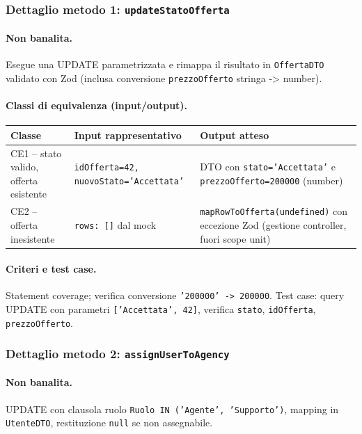 \documentclass[a4paper,11pt]{article}
\begin{document}
\subsubsection{Dettaglio metodo 1: \texttt{updateStatoOfferta}}
\paragraph{Non banalita.}
Esegue una UPDATE parametrizzata e rimappa il risultato in \texttt{OffertaDTO} validato con Zod (inclusa conversione \texttt{prezzoOfferto} stringa -> number).

\paragraph{Classi di equivalenza (input/output).}
\begin{table}[H]
\centering
\small
\begin{tabular}{@{}p{}p{}p{}@{}}
\toprule
Classe & Input rappresentativo & Output atteso \\
\midrule
CE1 -- stato valido, offerta esistente & \texttt{idOfferta=42, nuovoStato='Accettata'} & DTO con \texttt{stato='Accettata'} e \texttt{prezzoOfferto=200000} (number) \\
CE2 -- offerta inesistente & \texttt{rows: []} dal mock & \texttt{mapRowToOfferta(undefined)} con eccezione Zod (gestione controller, fuori scope unit) \\
\bottomrule
\end{tabular}
\end{table}

\paragraph{Criteri e test case.}
Statement coverage; verifica conversione \texttt{'200000' -> 200000}. Test case: query UPDATE con parametri \texttt{['Accettata', 42]}, verifica \texttt{stato}, \texttt{idOfferta}, \texttt{prezzoOfferto}.

\subsubsection{Dettaglio metodo 2: \texttt{assignUserToAgency}}
\paragraph{Non banalita.}
UPDATE con clausola ruolo \texttt{Ruolo IN ('Agente', 'Supporto')}, mapping in \texttt{UtenteDTO}, restituzione \texttt{null} se non assegnabile.
\end{document}
